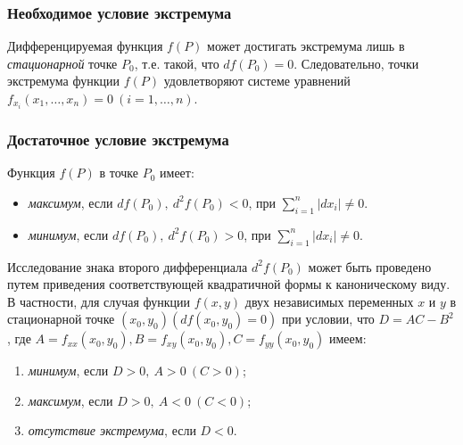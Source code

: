 	    \subsubsection*{Необходимое условие экстремума}

		    Дифференцируемая функция $f \left( P \right)$ может достигать экстремума лишь в \textit{стационарной} точке $P_{0}$, т.е. такой, что $d f \left( P_{0} \right) = 0$. Следовательно, точки экстремума функции $f \left( P \right)$ удовлетворяют системе уравнений $f_{x_{i}} \left( x_{1}, \ldots, x_{n} \right) = 0 \: (i = 1, \ldots, n)$.\\

	    \subsubsection*{Достаточное условие экстремума}

		    Функция $f \left( P \right)$ в точке $P_{0}$ имеет:

		    \begin{itemize}
		    	\item \textit{максимум}, если $d f \left( P_{0} \right), \: d^{2} f \left( P_{0} \right) < 0$, при $\sum^{n}_{i = 1} \left| d x_{i} \right| \neq 0$.
		    	\item \textit{минимум}, если $d f \left( P_{0} \right), \: d^{2} f \left( P_{0} \right) > 0$, при $\sum^{n}_{i = 1} \left| d x_{i} \right| \neq 0$.
		    \end{itemize}

		    Исследование знака второго дифференциала $d^{2} f \left( P_{0} \right)$ может быть проведено путем приведения соответствующей квадратичной формы к каноническому виду.\\

		    В частности, для случая функции $f \left( x, y \right)$ двух независимых переменных $x$ и $y$ в стационарной точке $\left( x_{0}, y_{0} \right) \left( d f \left( x_{0}, y_{0} \right) =0 \right)$ при условии, что $D = A C - B^{2}$, где $A = f_{xx} \left( x_{0}, y_{0} \right), B = f_{xy} \left( x_{0}, y_{0} \right), C = f_{yy} \left( x_{0}, y_{0} \right)$ имеем:

		    \begin{enumerate}
		    	\item \textit{минимум}, если $D > 0, \: A > 0 \: \left( C > 0 \right)$;
		    	\item \textit{максимум}, если $D > 0, \: A < 0 \: \left( C < 0 \right)$;
		    	\item \textit{отсутствие экстремума}, если $D < 0$.
		    \end{enumerate}

